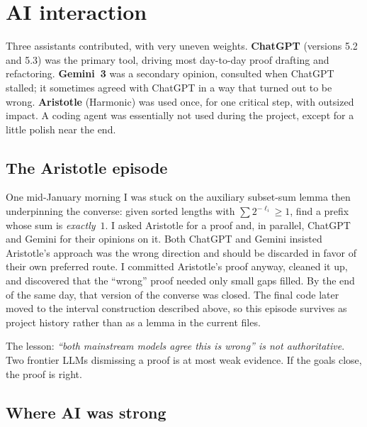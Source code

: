 \documentclass[11pt]{article}
\begin{document}
\section{AI interaction}
\label{sec:ai}

Three assistants contributed, with very uneven weights. \textbf{ChatGPT}
(versions 5.2 and 5.3) was the primary tool, driving most day-to-day proof
drafting and refactoring. \textbf{Gemini~3} was a secondary opinion,
consulted when ChatGPT stalled; it sometimes agreed with ChatGPT in a way
that turned out to be wrong. \textbf{Aristotle} (Harmonic) was used once,
for one critical step, with outsized impact. A coding agent was essentially
not used during the project, except for a little polish near the end.

\subsection*{The Aristotle episode}

One mid-January morning I was stuck on the auxiliary subset-sum lemma then
underpinning the converse: given sorted lengths with $\sum 2^{-\ell_i} \ge
1$, find a prefix whose sum is \emph{exactly}~$1$. I asked Aristotle for a
proof and, in parallel, ChatGPT and Gemini for their opinions on it. Both
ChatGPT and Gemini insisted Aristotle's approach was the wrong direction
and should be discarded in favor of their own preferred route. I
committed Aristotle's proof anyway, cleaned it up, and discovered that
the ``wrong'' proof needed only small gaps filled. By the end of the same
day, that version of the converse was closed. The final code later moved
to the interval construction described above, so this episode survives as
project history rather than as a lemma in the current files.

The lesson: \emph{``both mainstream models agree this is wrong'' is not
authoritative}. Two frontier LLMs dismissing a proof is at most weak
evidence. If the goals close, the proof is right.

\subsection*{Where AI was strong}
\end{document}
